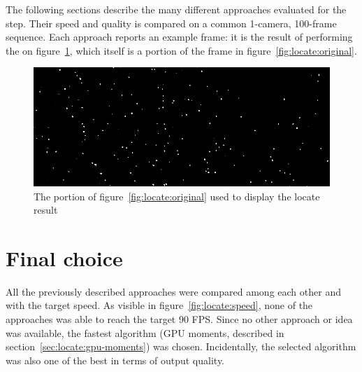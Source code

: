 The following sections describe the many different approaches evaluated for the \locate* step.
Their speed and quality is compared on a common 1-camera, 100-frame sequence.
Each approach reports an example frame: it is the result of performing the \locate* on figure~\ref{fig:locate:original-crop}, which itself is a portion of the frame in figure~\ref{fig:locate:original}.

\begin{figure}[H]
	\centerline{\includegraphics[width=\locateimgsize]{images/locate/_original-frame.png}}
	\caption{\centering The portion of figure~\ref{fig:locate:original} used to display the locate result}
	\label{fig:locate:original-crop}
\end{figure}


\newpage
 \newpage
 \newpage
 \newpage
 \newpage
 \newpage
 \newpage
 \newpage
 \newpage
 \newpage
 \newpage
 \newpage
 \newpage
 \newpage

\section{Final choice}

All the previously described approaches were compared among each other and with the target speed.
As visible in figure~\ref{fig:locate:speed}, none of the approaches was able to reach the target 90 FPS.
Since no other approach or idea was available, the fastest algorithm (GPU moments, described in section~\ref{sec:locate:gpu-moments}) was chosen.
Incidentally, the selected algorithm was also one of the best in terms of output quality.


